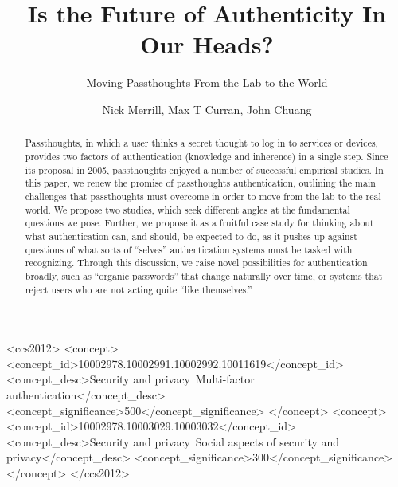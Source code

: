 \author{Nick Merrill, Max T Curran, John Chuang}


\title{Is the Future of Authenticity In Our Heads?}
\subtitle{Moving Passthoughts From the Lab to the World}

\begin{abstract}
Passthoughts, in which a user thinks a secret thought to log in to services or devices, provides two factors of authentication (knowledge and inherence) in a single step. Since its proposal in 2005, passthoughts enjoyed a number of successful empirical studies. In this paper, we renew the promise of passthoughts authentication, outlining the main challenges that passthoughts must overcome in order to move from the lab to the real world. We propose two studies, which seek different angles at the fundamental questions we pose. Further, we propose it as a fruitful case study for thinking about what authentication can, and should, be expected to do, as it pushes up against questions of what sorts of ``selves'' authentication systems must be tasked with recognizing. Through this discussion, we raise novel possibilities for authentication broadly, such as ``organic passwords'' that change naturally over time, or systems that reject users who are not acting quite ``like themselves.''
\end{abstract}

%
% 
%
%
\begin{CCSXML}
<ccs2012>
<concept>
<concept_id>10002978.10002991.10002992.10011619</concept_id>
<concept_desc>Security and privacy~Multi-factor authentication</concept_desc>
<concept_significance>500</concept_significance>
</concept>
<concept>
<concept_id>10002978.10003029.10003032</concept_id>
<concept_desc>Security and privacy~Social aspects of security and privacy</concept_desc>
<concept_significance>300</concept_significance>
</concept>
</ccs2012>
\end{CCSXML}


